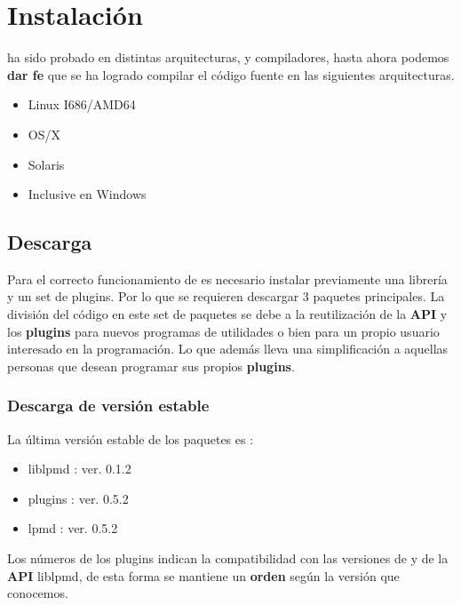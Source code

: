 \chapter{Instalaci\'on}
\label{chap:inst}

\lpmd ha sido probado en distintas arquitecturas, y compiladores, hasta ahora podemos \textbf{dar fe} que se ha logrado compilar el c\'odigo fuente en las siguientes arquitecturas.

\begin{itemize}
 \item Linux I686/AMD64
 \item OS/X
 \item Solaris
 \item Inclusive en Windows
\end{itemize}

\section{Descarga}

Para el correcto funcionamiento de \lpmd es necesario instalar previamente una librer\'ia y un set de plugins. Por lo que se requieren descargar 3 paquetes principales. La divisi\'on del c\'odigo en este set de paquetes se debe a la reutilizaci\'on de la \textbf{API} y los \textbf{plugins} para nuevos programas de utilidades o bien para un propio usuario interesado en la programaci\'on. Lo que adem\'as lleva una simplificaci\'on a aquellas personas que desean programar sus propios \textbf{plugins}.

\subsection{Descarga de versi\'on estable}

La \'ultima versi\'on estable de los paquetes es :

\begin{itemize}
 \item liblpmd : ver. 0.1.2
 \item plugins : ver. 0.5.2
 \item lpmd    : ver. 0.5.2
\end{itemize}

Los n\'umeros de los plugins indican la compatibilidad con las versiones de \lpmd y de la \textbf{API} liblpmd, de esta forma se mantiene un \textbf{orden} seg\'un la versi\'on que conocemos.

